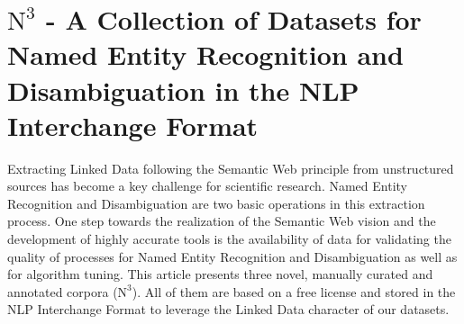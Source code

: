 


 

%
\chapter{$\mbox{N}^3$ - A Collection of Datasets for Named Entity Recognition and Disambiguation in the NLP Interchange Format}


Extracting Linked Data following the Semantic Web principle from unstructured sources has become a key challenge for scientific research. %
Named Entity Recognition and Disambiguation are two basic operations in this extraction process.
One step towards the realization of the Semantic Web vision and the development of highly accurate tools is the availability of data for validating the quality of processes for Named Entity Recognition and Disambiguation as well as for algorithm tuning.
This article presents three novel, manually curated and annotated corpora ($\mbox{N}^3$). All of them are based on a free license and stored in the NLP Interchange Format to leverage the Linked Data character of our datasets. %



